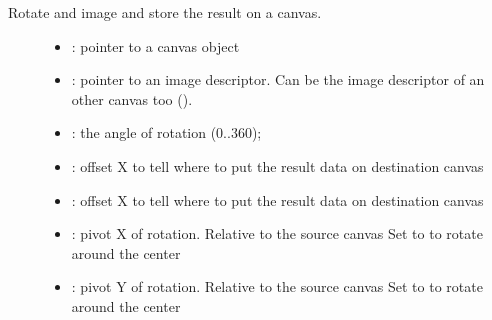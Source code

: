 \documentclass[letterpaper,10pt,english]{sphinxmanual}
\begin{document}
\begin{fulllineitems}
\label{\detokenize{object-types/canvas:_CPPv416lv_canvas_rotateP8lv_obj_tP12lv_img_dsc_t7int16_t10lv_coord_t10lv_coord_t7int32_t7int32_t}}%
\pysigstartmultiline
{}\label{\detokenize{object-types/canvas:lv__canvas_8h_1ac213babd9e74db8e5649b5a2466c3601}}%
\pysigstopmultiline
Rotate and image and store the result on a canvas. \begin{description}
\item[{}] \leavevmode\begin{itemize}
\item {} 
: pointer to a canvas object 

\item {} 
: pointer to an image descriptor. Can be the image descriptor of an other canvas too (). 

\item {} 
: the angle of rotation (0..360); 

\item {} 
: offset X to tell where to put the result data on destination canvas 

\item {} 
: offset X to tell where to put the result data on destination canvas 

\item {} 
: pivot X of rotation. Relative to the source canvas Set to  to rotate around the center 

\item {} 
: pivot Y of rotation. Relative to the source canvas Set to  to rotate around the center 

\end{itemize}

\end{description}


\end{fulllineitems}
\end{document}
